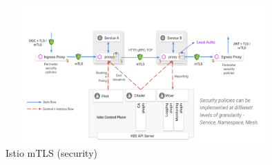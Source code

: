 \documentclass[default]{beamer}
\begin{document}
\begin{frame}
  \begin{figure}
    \includegraphics[width=300pt,height=150pt]{static/istio.png}
    \caption{Istio mTLS (security)}
  \end{figure}
\end{frame}
\end{document}
